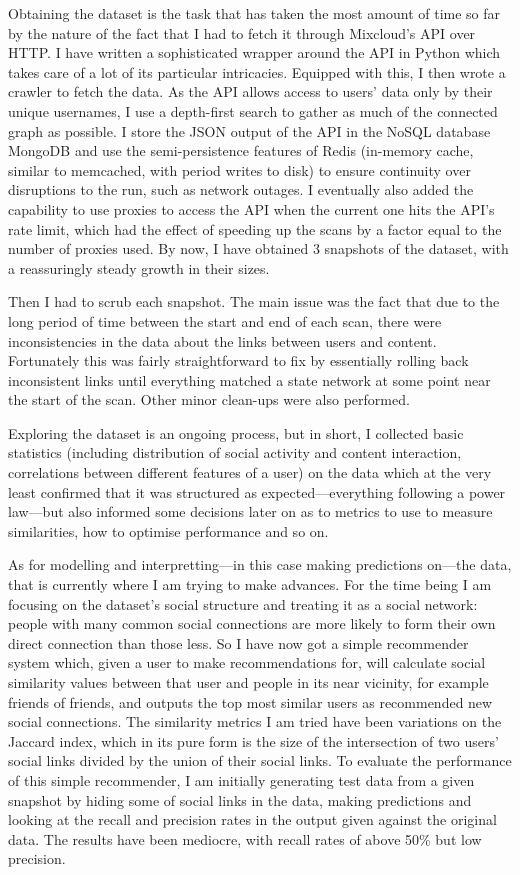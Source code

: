 \documentclass[a4paper,11pt,titlepage]{article}
\begin{document}
Obtaining the dataset is the task that has taken the most amount of time so far by the nature of the fact that I had to fetch it through Mixcloud's API over HTTP\@. I have written a sophisticated wrapper around the API in Python which takes care of a lot of its particular intricacies. Equipped with this, I then wrote a crawler to fetch the data. As the API allows access to users' data only by their unique usernames, I use a depth-first search to gather as much of the connected graph as possible. I store the JSON output of the API in the NoSQL database MongoDB and use the semi-persistence features of Redis (in-memory cache, similar to memcached, with period writes to disk) to ensure continuity over disruptions to the run, such as network outages. I eventually also added the capability to use proxies to access the API when the current one hits the API's rate limit, which had the effect of speeding up the scans by a factor equal to the number of proxies used. By now, I have obtained 3 snapshots of the dataset, with a reassuringly steady growth in their sizes.

Then I had to scrub each snapshot. The main issue was the fact that due to the long period of time between the start and end of each scan, there were inconsistencies in the data about the links between users and content. Fortunately this was fairly straightforward to fix by essentially rolling back inconsistent links until everything matched a state network at some point near the start of the scan. Other minor clean-ups were also performed.

Exploring the dataset is an ongoing process, but in short, I collected basic statistics (including distribution of social activity and content interaction, correlations between different features of a user) on the data which at the very least confirmed that it was structured as expected---everything following a power law---but also informed some decisions later on as to metrics to use to measure similarities, how to optimise performance and so on.

As for modelling and interpretting---in this case making predictions on---the data, that is currently where I am trying to make advances. For the time being I am focusing on the dataset's social structure and treating it as a social network: people with many common social connections are more likely to form their own direct connection than those less. So I have now got a simple recommender system which, given a user to make recommendations for, will calculate social similarity values between that user and people in its near vicinity, for example friends of friends, and outputs the top most similar users as recommended new social connections. The similarity metrics I am tried have been variations on the Jaccard index, which in its pure form is the size of the intersection of two users' social links divided by the union of their social links. To evaluate the performance of this simple recommender, I am initially generating test data from a given snapshot by hiding some of social links in the data, making predictions and looking at the recall and precision rates in the output given against the original data. The results have been mediocre, with recall rates of above 50\% but low precision.
\end{document}
